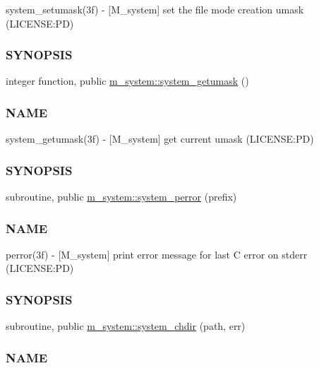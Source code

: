 \begin{DoxyCompactItemize}
\begin{DoxyCompactList}
system\+\_\+setumask(3f) -\/ \mbox{[}M\+\_\+system\mbox{]} set the file mode creation umask (L\+I\+C\+E\+N\+SE\+:PD) \subsubsection*{S\+Y\+N\+O\+P\+S\+IS}\end{DoxyCompactList}\item 
integer function, public \mbox{\hyperlink{namespacem__system_aa9ca951be39d2ea738d627cf42c00ddd}{m\+\_\+system\+::system\+\_\+getumask}} ()
\begin{DoxyCompactList}\small\item\em \subsubsection*{N\+A\+ME}

system\+\_\+getumask(3f) -\/ \mbox{[}M\+\_\+system\mbox{]} get current umask (L\+I\+C\+E\+N\+SE\+:PD) \subsubsection*{S\+Y\+N\+O\+P\+S\+IS}\end{DoxyCompactList}\item 
subroutine, public \mbox{\hyperlink{namespacem__system_afae451a1fc5432274dc1f75a364051b4}{m\+\_\+system\+::system\+\_\+perror}} (prefix)
\begin{DoxyCompactList}\small\item\em \subsubsection*{N\+A\+ME}

perror(3f) -\/ \mbox{[}M\+\_\+system\mbox{]} print error message for last C error on stderr (L\+I\+C\+E\+N\+SE\+:PD) \subsubsection*{S\+Y\+N\+O\+P\+S\+IS}\end{DoxyCompactList}\item 
subroutine, public \mbox{\hyperlink{namespacem__system_a47746b670cb21bae0957c9bb2bccf209}{m\+\_\+system\+::system\+\_\+chdir}} (path, err)
\begin{DoxyCompactList}\small\item\em \subsubsection*{N\+A\+ME}


\end{DoxyCompactList}
\end{DoxyCompactItemize}
